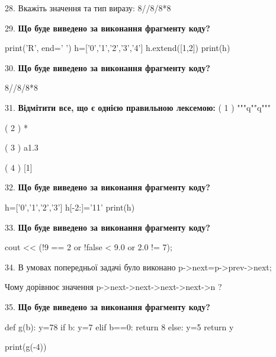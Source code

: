 \documentclass[11pt]{article}
\begin{document}
28. 
Вкажіть значення та тип виразу:
8//8/8*8
\par\vspace{5mm}

29. \textbf{Що буде виведено за виконання фрагменту коду?}

print('R', end=' ')
h=['0','1','2','3','4']
h.extend([1,2])
print(h)

\par\vspace{5mm}

30. \textbf{Що буде виведено за виконання фрагменту коду?}

8//8/8*8
\par\vspace{5mm}

31. %
\textbf{Відмітити все, що є однією правильною лексемою:}
( 1 ) """q""q"""

( 2 ) *

( 3 ) a1.3

( 4 ) [1]
\par\vspace{5mm}

32. \textbf{Що буде виведено за виконання фрагменту коду?}

h=['0','1','2','3']
h[-2:]='11'
print(h)

\par\vspace{5mm}

33. \textbf{Що буде виведено за виконання фрагменту коду?}

cout << (!9 == 2 or !false < 9.0 or 2.0 != 7);
\par\vspace{5mm}

34. 
В умовах попередньої задачі було виконано p->next=p->prev->next;

Чому дорівнює значення p->next->next->next->next->n ?\par\vspace{5mm}

35. \textbf{Що буде виведено за виконання фрагменту коду?}

def g(b):
    y=78
    if b: 
        y=7
    elif b==0:
         return 8
    else:
         y=5
    return y

print(g(-4))
\par\vspace{5mm}
\end{document}
